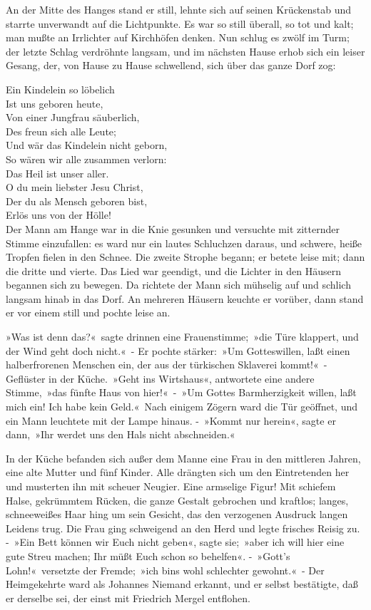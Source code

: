 An der Mitte des Hanges stand er still, lehnte sich auf seinen Krückenstab und starrte unverwandt auf die Lichtpunkte. Es war so still überall, so tot und kalt; man mußte an Irrlichter auf Kirchhöfen denken. Nun schlug es zwölf im Turm; der letzte Schlag verdröhnte langsam, und im nächsten Hause erhob sich ein leiser Gesang, der, von Hause zu Hause schwellend, sich über das ganze Dorf zog:

Ein Kindelein so löbelich\\
Ist uns geboren heute,\\
Von einer Jungfrau säuberlich,\\
Des freun sich alle Leute;\\
Und wär das Kindelein nicht geborn,\\
So wären wir alle zusammen verlorn:\\
Das Heil ist unser aller.\\
O du mein liebster Jesu Christ,\\
Der du als Mensch geboren bist,\\
Erlös uns von der Hölle!\\

Der Mann am Hange war in die Knie gesunken und versuchte mit zitternder Stimme einzufallen: es ward nur ein lautes Schluchzen daraus, und schwere, heiße Tropfen fielen in den Schnee. Die zweite Strophe begann; er betete leise mit; dann die dritte und vierte. Das Lied war geendigt, und die Lichter in den Häusern begannen sich zu bewegen. Da richtete der Mann sich mühselig auf und schlich langsam hinab in das Dorf. An mehreren Häusern keuchte er vorüber, dann stand er vor einem still und pochte leise an.

»Was ist denn das?« sagte drinnen eine Frauenstimme; »die Türe klappert, und der Wind geht doch nicht.« - Er pochte stärker: »Um Gotteswillen, laßt einen halberfrorenen Menschen ein, der aus der türkischen Sklaverei kommt!« - Geflüster in der Küche. »Geht ins Wirtshaus«, antwortete eine andere Stimme, »das fünfte Haus von hier!« - »Um Gottes Barmherzigkeit willen, laßt mich ein! Ich habe kein Geld.« Nach einigem Zögern ward die Tür geöffnet, und ein Mann leuchtete mit der Lampe hinaus. - »Kommt nur herein«, sagte er dann, »Ihr werdet uns den Hals nicht abschneiden.«

In der Küche befanden sich außer dem Manne eine Frau in den mittleren Jahren, eine alte Mutter und fünf Kinder. Alle drängten sich um den Eintretenden her und musterten ihn mit scheuer Neugier. Eine armselige Figur! Mit schiefem Halse, gekrümmtem Rücken, die ganze Gestalt gebrochen und kraftlos; langes, schneeweißes Haar hing um sein Gesicht, das den verzogenen Ausdruck langen Leidens trug. Die Frau ging schweigend an den Herd und legte frisches Reisig zu. - »Ein Bett können wir Euch nicht geben«, sagte sie; »aber ich will hier eine gute Streu machen; Ihr müßt Euch schon so behelfen«. - »Gott’s Lohn!« versetzte der Fremde; »ich bins wohl schlechter gewohnt.« - Der Heimgekehrte ward als Johannes Niemand erkannt, und er selbst bestätigte, daß er derselbe sei, der einst mit Friedrich Mergel entflohen.


